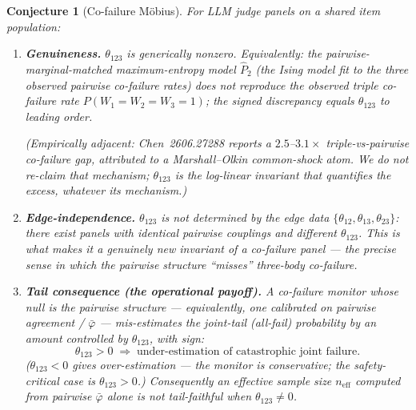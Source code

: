 \documentclass[11pt,a4paper]{article}
\theoremstyle{conjstyle}
\newtheorem{conjecture}{Conjecture}
\theoremstyle{remark}
\begin{document}
\begin{conjecture}[Co-failure M\"{o}bius]
For LLM judge panels on a shared item population:
\begin{enumerate}[label=\textbf{(\roman*)}]
  \item \textbf{Genuineness.}
    $\theta_{123}$ is generically nonzero.  Equivalently: the
    pairwise-marginal-matched maximum-entropy model $\hat{P}_2$ (the Ising
    model fit to the three observed pairwise co-failure rates) does \emph{not}
    reproduce the observed triple co-failure rate $P(W_1 = W_2 = W_3 = 1)$;
    the signed discrepancy equals $\theta_{123}$ to leading order.

    \medskip
    \noindent\textit{(Empirically adjacent: Chen~2606.27288 reports a
    $2.5$--$3.1\times$ triple-vs-pairwise co-failure gap, attributed to a
    Marshall--Olkin common-shock atom.  We do not re-claim that mechanism;
    $\theta_{123}$ is the log-linear invariant that quantifies the excess,
    whatever its mechanism.)}

  \item \textbf{Edge-independence.}
    $\theta_{123}$ is not determined by the edge data
    $\{\theta_{12}, \theta_{13}, \theta_{23}\}$: there exist panels with
    identical pairwise couplings and different $\theta_{123}$.  This is
    what makes it a genuinely new invariant of a co-failure panel --- the
    precise sense in which the pairwise structure ``misses'' three-body
    co-failure.

  \item \textbf{Tail consequence (the operational payoff).}
    A co-failure monitor whose null is the pairwise structure --- equivalently,
    one calibrated on pairwise agreement / $\bar\varphi$ --- mis-estimates the
    joint-tail (all-fail) probability by an amount controlled by $\theta_{123}$,
    with sign:
    \[
      \theta_{123} > 0
      \;\Longrightarrow\;
      \text{under-estimation of catastrophic joint failure.}
    \]
    ($\theta_{123} < 0$ gives over-estimation --- the monitor is conservative;
    the safety-critical case is $\theta_{123} > 0$.)
    Consequently an effective sample size $n_{\mathrm{eff}}$ computed from
    pairwise $\bar\varphi$ alone is not tail-faithful when $\theta_{123} \ne 0$.
\end{enumerate}
\end{conjecture}
\end{document}
